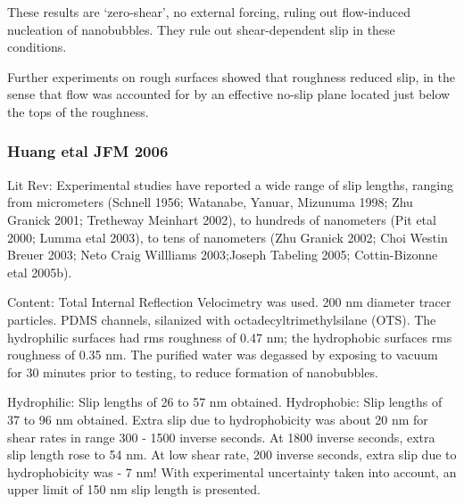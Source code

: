 \documentclass[twocolumn]{article}
\begin{document}
These results are `zero-shear', no external forcing, ruling out flow-induced nucleation of nanobubbles. They rule out shear-dependent slip in these conditions.

Further experiments on rough surfaces showed that roughness reduced slip, in the sense that flow was accounted for by an effective no-slip plane located just below the tops of the roughness.


\subsubsection*{Huang etal JFM 2006}
Lit Rev: Experimental studies have reported a wide range of slip lengths, ranging from micrometers (Schnell 1956; Watanabe, Yanuar, Mizunuma 1998; Zhu Granick 2001; Tretheway Meinhart 2002), to hundreds of nanometers (Pit etal 2000; Lumma etal 2003), to tens of nanometers (Zhu Granick 2002; Choi Westin Breuer 2003; Neto Craig Willliams 2003;Joseph Tabeling 2005; Cottin-Bizonne etal 2005b).

Content: Total Internal Reflection Velocimetry was used.  200 nm diameter tracer particles. PDMS channels, silanized with octadecyltrimethylsilane (OTS). The hydrophilic surfaces had rms roughness of 0.47 nm; the hydrophobic surfaces rms roughness of 0.35 nm. The purified water was degassed by exposing to vacuum for 30 minutes prior to testing, to reduce formation of nanobubbles.

Hydrophilic: Slip lengths of 26 to 57 nm obtained. Hydrophobic: Slip lengths of 37 to 96 nm obtained.  Extra slip due to hydrophobicity was about 20 nm for shear rates in range 300 - 1500 inverse seconds. At 1800 inverse seconds, extra slip length rose to 54 nm. At low shear rate, 200 inverse seconds, extra slip due to hydrophobicity was - 7 nm!
With experimental uncertainty taken into account, an upper limit of 150 nm slip length is presented.
\end{document}
